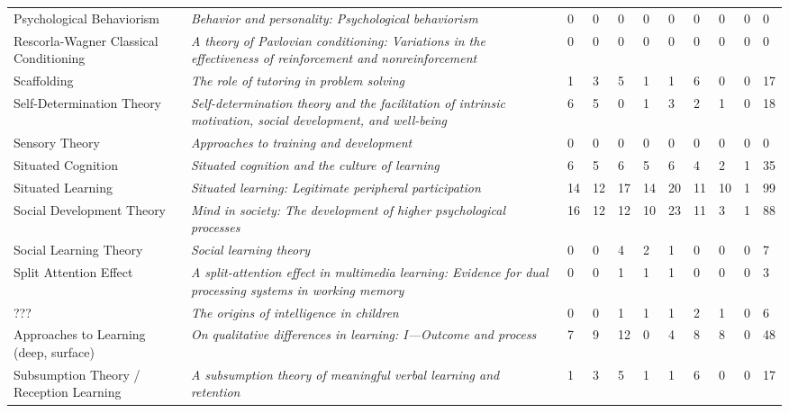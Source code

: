 \begin{table*}[t]
\begin{tabular}{p{3cm}p{5cm}lllllllll}
Psychological Behaviorism & \textit{Behavior and personality: Psychological behaviorism}~\cite{staats1996behavior} & 0 & 0 & 0 & 0 & 0 & 0 & 0 & 0 & 0\\
Rescorla-Wagner Classical Conditioning & \textit{A theory of Pavlovian conditioning: Variations in the effectiveness of reinforcement and nonreinforcement}~\cite{rescorla1972theory} & 0 & 0 & 0 & 0 & 0 & 0 & 0 & 0 & 0\\
Scaffolding & \textit{The role of tutoring in problem solving}~\cite{wood1976role} & 1 & 3 & 5 & 1 & 1 & 6 & 0 & 0 & 17\\
Self-Determination Theory & \textit{Self-determination theory and the facilitation of intrinsic motivation, social development, and well-being}~\cite{ryan2000self} & 6 & 5 & 0 & 1 & 3 & 2 & 1 & 0 & 18\\
Sensory Theory & \textit{Approaches to training and development}~\cite{laird1985approaches} & 0 & 0 & 0 & 0 & 0 & 0 & 0 & 0 & 0\\
Situated Cognition & \textit{Situated cognition and the culture of learning}~\cite{brown1989situated} & 6 & 5 & 6 & 5 & 6 & 4 & 2 & 1 & 35\\
Situated Learning & \textit{Situated learning: Legitimate peripheral participation}~\cite{lave1991situated} & 14 & 12 & 17 & 14 & 20 & 11 & 10 & 1 & 99\\
Social Development Theory & \textit{Mind in society: The development of higher psychological processes}~\cite{vygotsky1978mind} & 16 & 12 & 12 & 10 & 23 & 11 & 3 & 1 & 88\\
Social Learning Theory & \textit{Social learning theory}~\cite{bandura1977social} & 0 & 0 & 4 & 2 & 1 & 0 & 0 & 0 & 7\\
Split Attention Effect & \textit{A split-attention effect in multimedia learning: Evidence for dual processing systems in working memory}~\cite{mayer1998split} & 0 & 0 & 1 & 1 & 1 & 0 & 0 & 0 & 3\\
??? & \textit{The origins of intelligence in children}~\cite{???} & 0 & 0 & 1 & 1 & 1 & 2 & 1 & 0 & 6\\
Approaches to Learning (deep, surface) & \textit{On qualitative differences in learning: I—Outcome and process}~\cite{marton1976qualitative} & 7 & 9 & 12 & 0 & 4 & 8 & 8 & 0 & 48\\
Subsumption Theory / Reception Learning & \textit{A subsumption theory of meaningful verbal learning and retention}~\cite{ausubel1962subsumption} & 1 & 3 & 5 & 1 & 1 & 6 & 0 & 0 & 17\\

\end{tabular}
\end{table*}
